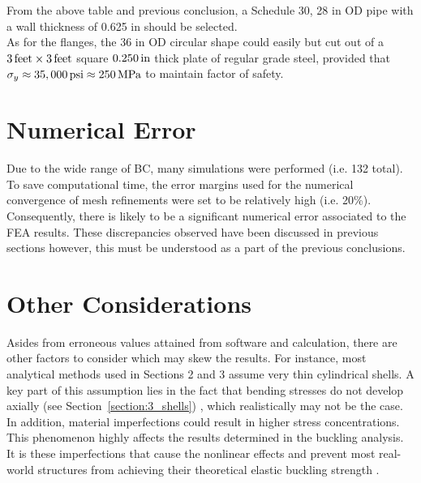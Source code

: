 From the above table and previous conclusion, a Schedule 30, 28 in OD pipe with a wall thickness of 0.625 in should be selected.\\


As for the flanges, the 36 in OD circular shape could easily but cut out of a $3\,\mathrm{feet}\times 3\,\mathrm{feet}$ square $0.250\,\mathrm{in}$ thick plate of regular grade steel, provided that $\sigma_y\approx 35,000 \,\mathrm{psi} \approx 250 \,\mathrm{MPa}$ to maintain factor of safety.


\section{Numerical Error}
\label{subsection:5_numerr}
Due to the wide range of BC, many simulations were performed (i.e. 132 total). To save computational time, the error margins used for the numerical convergence of mesh refinements were set to be relatively high (i.e. 20\%). Consequently, there is likely to be a significant numerical error associated to the FEA results. These discrepancies observed have been discussed in previous sections however, this must be understood as a part of the previous conclusions.


\section{Other Considerations}
Asides from erroneous values attained from software and calculation, there are other factors to consider which may skew the results. For instance, most analytical methods used in Sections 2 and 3 assume very thin cylindrical shells. A key part of this assumption lies in the fact that bending stresses do not develop axially (see Section~\ref{section:3_shells}) \cite{timoshenko1959theory}, which realistically may not be the case.\\

In addition, material imperfections could result in higher stress concentrations. This phenomenon highly affects the results determined in the buckling analysis. It is these imperfections that cause the nonlinear effects and prevent most real-world structures from achieving their theoretical elastic buckling strength \cite{ANSYS}.

